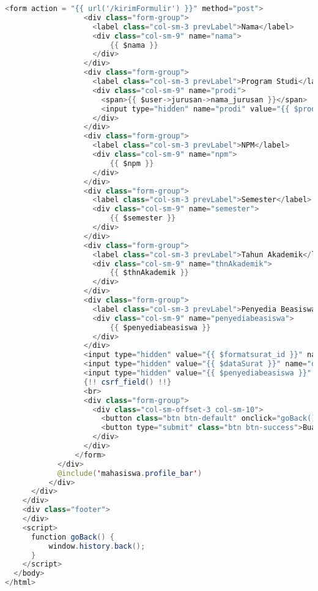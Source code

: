 \begin{lstlisting}[language=Java,basicstyle=\tiny,caption=Preview isi data keterangan beasiswa]
                <form action = "{{ url('/kirimFormulir') }}" method="post">
                  <div class="form-group">
                    <label class="col-sm-3 prevLabel">Nama</label>
                    <div class="col-sm-9" name="nama">
                        {{ $nama }}
                    </div>
                  </div>
                  <div class="form-group">
                    <label class="col-sm-3 prevLabel">Program Studi</label>
                    <div class="col-sm-9" name="prodi">
                      <span>{{ $user->jurusan->nama_jurusan }}</span>
                      <input type="hidden" name="prodi" value="{{ $prodi }}"/>
                    </div>
                  </div>
                  <div class="form-group">
                    <label class="col-sm-3 prevLabel">NPM</label>
                    <div class="col-sm-9" name="npm">
                        {{ $npm }}
                    </div>
                  </div>
                  <div class="form-group">
                    <label class="col-sm-3 prevLabel">Semester</label>
                    <div class="col-sm-9" name="semester">
                        {{ $semester }}
                    </div>
                  </div>
                  <div class="form-group">
                    <label class="col-sm-3 prevLabel">Tahun Akademik</label>
                    <div class="col-sm-9" name="thnAkademik">
                        {{ $thnAkademik }}
                    </div>
                  </div>
                  <div class="form-group">
                    <label class="col-sm-3 prevLabel">Penyedia Beasiswa</label>
                    <div class="col-sm-9" name="penyediabeasiswa">
                        {{ $penyediabeasiswa }}
                    </div>
                  </div>
                  <input type="hidden" value="{{ $formatsurat_id }}" name="idFormat">
                  <input type="hidden" value="{{ $dataSurat }}" name="dataSurat">
                  <input type="hidden" value="{{ $penyediabeasiswa }}" name="provider">
                  {!! csrf_field() !!}
                  <br>
                  <div class="form-group">
                    <div class="col-sm-offset-3 col-sm-10">
                      <button class="btn btn-default" onclick="goBack()">Kembali</button>
                      <button type="submit" class="btn btn-success">Buat Surat</button>
                    </div>
                  </div>
                </form>
            </div>
            @include('mahasiswa.profile_bar')
          </div>
      </div>
    </div>
    <div class="footer">
    </div>
    <script>
      function goBack() {
          window.history.back();
      }
    </script>
  </body>
</html>

\end{lstlisting}

